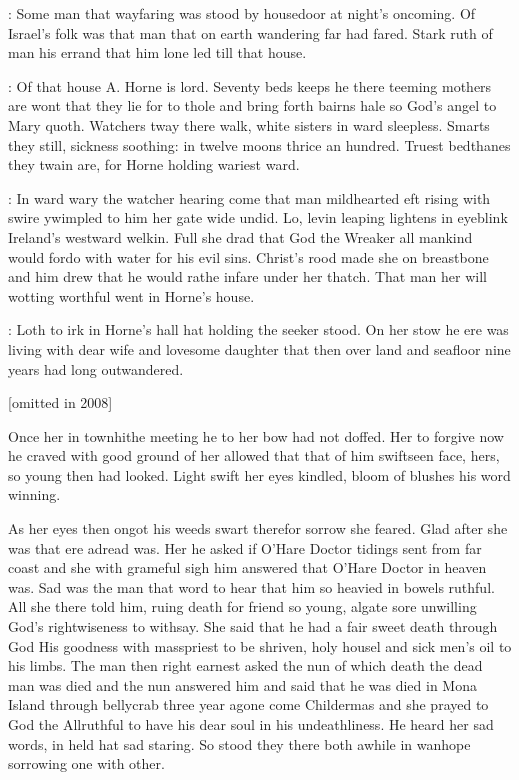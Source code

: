 

:
Some man that wayfaring was stood by housedoor at night's
oncoming.
Of Israel's folk was that man that on earth wandering far had
fared.
Stark ruth of man his errand that him lone led till that house.


:
Of that house A. Horne is lord.
Seventy beds keeps he there teeming
mothers are wont that they lie for to thole and bring forth bairns hale so
God's angel to Mary quoth.
Watchers tway there walk,
white sisters in
ward sleepless.
Smarts they still,
sickness soothing:
in twelve moons
thrice an hundred.
Truest bedthanes they twain are,
for Horne holding
wariest ward.


:
In ward wary the watcher hearing come that man mildhearted eft
rising with swire ywimpled to him her gate wide undid.
Lo,
levin leaping
lightens in eyeblink Ireland's westward welkin.
Full she drad that God the
Wreaker all mankind would fordo with water for his evil sins.
Christ's
rood made she on breastbone and him drew that he would rathe infare under
her thatch.
That man her will wotting worthful went in Horne's house.



:
Loth to irk in Horne's hall hat holding the seeker stood.
On her stow
he ere was living with dear wife and lovesome daughter that then over land
and seafloor nine years had long outwandered.

[omitted in 2008]

Once her in townhithe
meeting he to her bow had not doffed.
Her to forgive now he craved with
good ground of her allowed that that of him swiftseen face,
hers,
so young
then had looked.
Light swift her eyes kindled,
bloom of blushes his word
winning.


As her eyes then ongot his weeds swart therefor sorrow she feared.
Glad after she was that ere adread was.
Her he asked if O'Hare Doctor
tidings sent from far coast and she with grameful sigh him answered that
O'Hare Doctor in heaven was.
Sad was the man that word to hear that him
so heavied in bowels ruthful.
All she there told him,
ruing death for
friend so young,
algate sore unwilling God's rightwiseness to withsay.
She
said that he had a fair sweet death through God His goodness with
masspriest to be shriven,
holy housel and sick men's oil to his limbs.
The
man then right earnest asked the nun of which death the dead man was died
and the nun answered him and said that he was died in Mona Island through
bellycrab three year agone come Childermas and she prayed to God the
Allruthful to have his dear soul in his undeathliness.
He heard her sad
words,
in held hat sad staring.
So stood they there both awhile in wanhope
sorrowing one with other.

